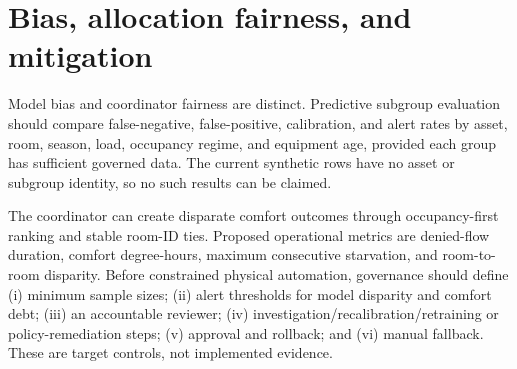\section{Bias, allocation fairness, and mitigation}
Model bias and coordinator fairness are distinct. Predictive subgroup evaluation should compare false-negative, false-positive, calibration, and alert rates by asset, room, season, load, occupancy regime, and equipment age, provided each group has sufficient governed data. The current synthetic rows have no asset or subgroup identity, so no such results can be claimed.

The coordinator can create disparate comfort outcomes through occupancy-first ranking and stable room-ID ties. Proposed operational metrics are denied-flow duration, comfort degree-hours, maximum consecutive starvation, and room-to-room disparity. Before constrained physical automation, governance should define (i) minimum sample sizes; (ii) alert thresholds for model disparity and comfort debt; (iii) an accountable reviewer; (iv) investigation/recalibration/retraining or policy-remediation steps; (v) approval and rollback; and (vi) manual fallback. These are target controls, not implemented evidence.

